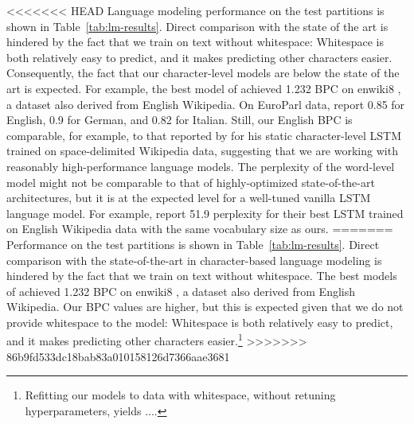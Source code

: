 <<<<<<< HEAD
Language modeling performance on the test partitions is shown in
Table~\ref{tab:lm-results}.  Direct comparison with the state of the art is hindered by
the fact that we train on text without whitespace: Whitespace is both
relatively easy to predict, and it makes predicting other
characters easier. Consequently, the fact that our character-level models are
below the state of the art is expected. For example, the best model of
 achieved 1.232 BPC on enwiki8
\cite{hutter2018}, a dataset also derived from English
Wikipedia. %
On EuroParl data,  report 0.85 for English,
0.9 for German, and 0.82 for Italian. Still, our English BPC is
comparable, for example, to that reported by  for
his static character-level LSTM trained on space-delimited Wikipedia data,
suggesting that we are working with reasonably high-performance language
models. The perplexity of the word-level model might not be comparable to
that of highly-optimized state-of-the-art architectures, but it is at the
expected level for a well-tuned vanilla LSTM language model. For
example,  report 51.9 perplexity for
their best LSTM trained on English Wikipedia data with the same vocabulary
size as ours.
=======
Performance on the test partitions is shown in Table~\ref{tab:lm-results}.
Direct comparison with the state-of-the-art in character-based language modeling is hindered by the fact that we train on text without whitespace.
The best models of \cite{merity2018analysis} achieved 1.232 BPC on enwiki8 \cite{hutter2018}, a dataset also derived from English Wikipedia. %
Our BPC values are higher, but this is expected given that we do not provide whitespace to the model: Whitespace is both relatively easy to predict, and it makes predicting other characters easier.\footnote{Refitting our models to data with whitespace, without retuning hyperparameters, yields ....}
>>>>>>> 86b9fd533dc18bab83a010158126d7366aae3681

